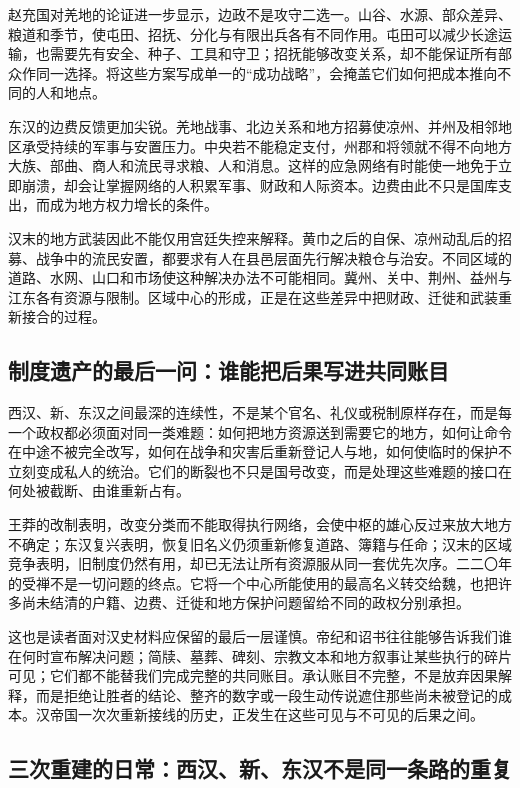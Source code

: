 赵充国对羌地的论证进一步显示，边政不是攻守二选一。山谷、水源、部众差异、粮道和季节，使屯田、招抚、分化与有限出兵各有不同作用。屯田可以减少长途运输，也需要先有安全、种子、工具和守卫；招抚能够改变关系，却不能保证所有部众作同一选择。将这些方案写成单一的“成功战略”，会掩盖它们如何把成本推向不同的人和地点。

东汉的边费反馈更加尖锐。羌地战事、北边关系和地方招募使凉州、并州及相邻地区承受持续的军事与安置压力。中央若不能稳定支付，州郡和将领就不得不向地方大族、部曲、商人和流民寻求粮、人和消息。这样的应急网络有时能使一地免于立即崩溃，却会让掌握网络的人积累军事、财政和人际资本。边费由此不只是国库支出，而成为地方权力增长的条件。

汉末的地方武装因此不能仅用宫廷失控来解释。黄巾之后的自保、凉州动乱后的招募、战争中的流民安置，都要求有人在县邑层面先行解决粮仓与治安。不同区域的道路、水网、山口和市场使这种解决办法不可能相同。冀州、关中、荆州、益州与江东各有资源与限制。区域中心的形成，正是在这些差异中把财政、迁徙和武装重新接合的过程。

\subsection{制度遗产的最后一问：谁能把后果写进共同账目}

西汉、新、东汉之间最深的连续性，不是某个官名、礼仪或税制原样存在，而是每一个政权都必须面对同一类难题：如何把地方资源送到需要它的地方，如何让命令在中途不被完全改写，如何在战争和灾害后重新登记人与地，如何使临时的保护不立刻变成私人的统治。它们的断裂也不只是国号改变，而是处理这些难题的接口在何处被截断、由谁重新占有。

王莽的改制表明，改变分类而不能取得执行网络，会使中枢的雄心反过来放大地方不确定；东汉复兴表明，恢复旧名义仍须重新修复道路、簿籍与任命；汉末的区域竞争表明，旧制度仍然有用，却已无法让所有资源服从同一套优先次序。二二〇年的受禅不是一切问题的终点。它将一个中心所能使用的最高名义转交给魏，也把许多尚未结清的户籍、边费、迁徙和地方保护问题留给不同的政权分别承担。

这也是读者面对汉史材料应保留的最后一层谨慎。帝纪和诏书往往能够告诉我们谁在何时宣布解决问题；简牍、墓葬、碑刻、宗教文本和地方叙事让某些执行的碎片可见；它们都不能替我们完成完整的共同账目。承认账目不完整，不是放弃因果解释，而是拒绝让胜者的结论、整齐的数字或一段生动传说遮住那些尚未被登记的成本。汉帝国一次次重新接线的历史，正发生在这些可见与不可见的后果之间。

\subsection{三次重建的日常：西汉、新、东汉不是同一条路的重复}

